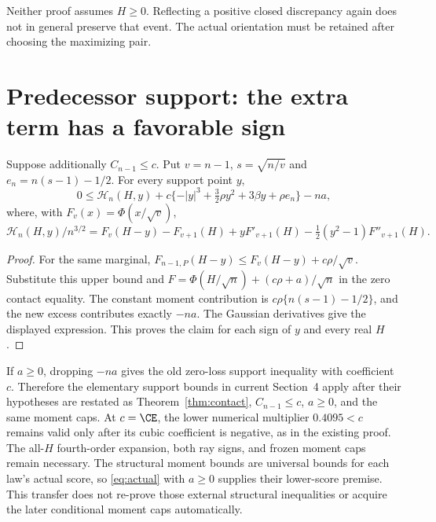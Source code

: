 Neither proof assumes $H\ge0$. Reflecting a positive closed discrepancy
again does not in general preserve that event. The actual orientation
must be retained after choosing the maximizing pair.

\section{Predecessor support: the extra term has a favorable sign}
\begin{theorem}\label{thm:support}
Suppose additionally $C_{n-1}\le c$. Put $v=n-1$,
$s=\sqrt{n/v}$ and $e_n=n(s-1)-1/2$. For every support point $y$,
\begin{equation}\label{eq:support}
 0\le\mathcal H_n(H,y)
       +c\{-|y|^3+\tfrac32\rho y^2+3\beta y+\rho e_n\}-na,
\end{equation}
where, with $F_v(x)=\Phi(x/\sqrt v)$,
\[
 \mathcal H_n(H,y)/n^{3/2}
 =F_v(H-y)-F_{v+1}(H)+yF'_{v+1}(H)
                    -\tfrac12(y^2-1)F''_{v+1}(H).
\]
\end{theorem}
\begin{proof}
For the same marginal,
$F_{n-1,P}(H-y)\le F_v(H-y)+c\rho/\sqrt v$.
Substitute this upper bound and
$F=\Phi(H/\sqrt n)+(c\rho+a)/\sqrt n$ in the zero contact equality.
The constant moment contribution is
$c\rho\{n(s-1)-1/2\}$, and the new excess contributes exactly $-na$.
The Gaussian derivatives give the displayed expression. This proves the
claim for each sign of $y$ and every real $H$.
\end{proof}

If $a\ge0$, dropping $-na$ gives the old zero-loss support inequality
with coefficient $c$. Therefore the elementary support bounds in current
Section~4 apply after their hypotheses are restated as
Theorem~\ref{thm:contact}, $C_{n-1}\le c$, $a\ge0$, and the same moment
caps. At $c=\CE$, the lower numerical multiplier $0.4095<c$ remains
valid only after its cubic coefficient is negative, as in the existing
proof. The all-$H$ fourth-order expansion, both ray signs, and frozen
moment caps remain necessary. The structural moment bounds are universal
bounds for each law's actual score, so \eqref{eq:actual} with $a\ge0$
supplies their lower-score premise. This transfer does not re-prove those
external structural inequalities or acquire the later conditional moment
caps automatically.

